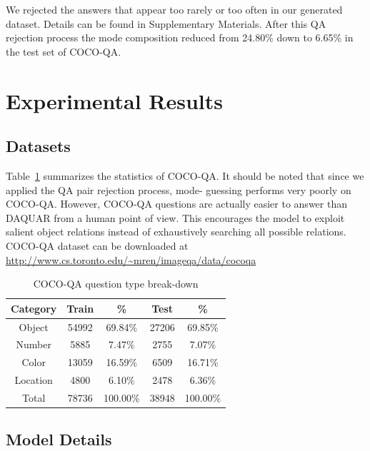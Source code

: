 \documentclass{article} %
\renewcommand{\#}[1]{\textbf{#1}}
\begin{document}
We rejected the answers that appear too rarely or too often in our generated
dataset. Details can be found in Supplementary Materials. After this QA
rejection process the mode composition reduced from 24.80\% down to 6.65\% in
the test set of COCO-QA.

\section{Experimental Results}

\subsection{Datasets}

Table~\ref{tab:dataset_category_stats} summarizes the statistics of COCO-QA. It
should be noted that since we applied the QA pair rejection process, mode-
guessing performs very poorly on COCO-QA. However, COCO-QA questions are
actually easier to answer than DAQUAR from a human point of view. This
encourages the model to exploit salient object relations instead of
exhaustively searching all possible relations. COCO-QA dataset can be
downloaded at \url{http://www.cs.toronto.edu/~mren/imageqa/data/cocoqa}

\begin{table}
\caption{COCO-QA question type break-down}
\label{tab:dataset_category_stats}
\vskip 0.15in
\begin{center}
\begin{small}
\begin{sc}
\begin{tabular}{c c c c c}
\hline
Category & Train & \%       & Test  & \%       \\
\hline
Object   & 54992 & 69.84\%  & 27206 & 69.85\%  \\
Number   & 5885  & 7.47\%   & 2755  & 7.07\%   \\
Color    & 13059 & 16.59\%  & 6509  & 16.71\%  \\
Location & 4800  & 6.10\%   & 2478  & 6.36\%   \\
\hline
Total    & 78736 & 100.00\% & 38948 & 100.00\% \\
\hline
\end{tabular}
\end{sc}
\end{small}
\end{center}
\end{table}

\subsection{Model Details}
\end{document}
